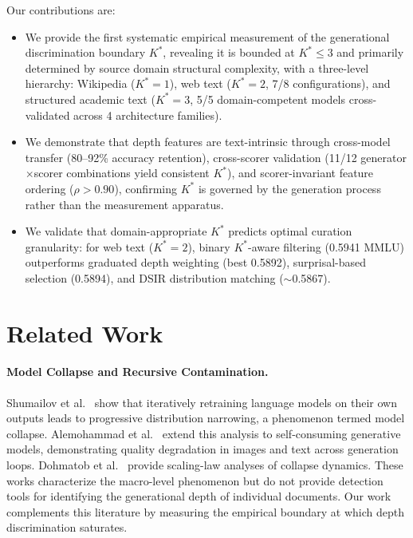 \documentclass[11pt,a4paper]{article}
\newcommand{\Kstar}{K^{*}}
\begin{document}
Our contributions are:
\begin{itemize}
\item We provide the first systematic empirical measurement of the generational discrimination boundary $\Kstar$, revealing it is bounded at $\Kstar \leq 3$ and primarily determined by source domain structural complexity, with a three-level hierarchy: Wikipedia ($\Kstar=1$), web text ($\Kstar=2$, 7/8 configurations), and structured academic text ($\Kstar=3$, 5/5 domain-competent models cross-validated across 4 architecture families).
\item We demonstrate that depth features are text-intrinsic through cross-model transfer (80--92\% accuracy retention), cross-scorer validation (11/12 generator$\times$scorer combinations yield consistent $\Kstar$), and scorer-invariant feature ordering ($\rho > 0.90$), confirming $\Kstar$ is governed by the generation process rather than the measurement apparatus.
\item We validate that domain-appropriate $\Kstar$ predicts optimal curation granularity: for web text ($\Kstar=2$), binary $\Kstar$-aware filtering (0.5941 MMLU) outperforms graduated depth weighting (best 0.5892), surprisal-based selection (0.5894), and DSIR distribution matching ($\sim$0.5867).
\end{itemize}

\section{Related Work}

\paragraph{Model Collapse and Recursive Contamination.}
Shumailov et al.~\cite{shumailov2024modelcollapse} show that iteratively retraining language models on their own outputs leads to progressive distribution narrowing, a phenomenon termed model collapse. Alemohammad et al.~\cite{alemohammad2024selfconsuming} extend this analysis to self-consuming generative models, demonstrating quality degradation in images and text across generation loops. Dohmatob et al.~\cite{dohmatob2024tale} provide scaling-law analyses of collapse dynamics. These works characterize the macro-level phenomenon but do not provide detection tools for identifying the generational depth of individual documents. Our work complements this literature by measuring the empirical boundary at which depth discrimination saturates.
\end{document}
